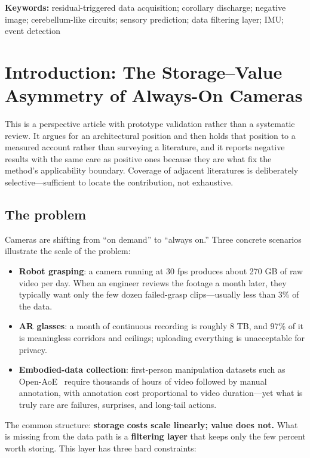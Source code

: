\documentclass[12pt,a4paper]{article}
\begin{document}
\noindent\textbf{Keywords:} residual-triggered data acquisition; corollary discharge; negative image; cerebellum-like circuits; sensory prediction; data filtering layer; IMU; event detection

\tableofcontents
\newpage

\section{Introduction: The Storage--Value Asymmetry of Always-On Cameras}

This is a perspective article with prototype validation rather than a systematic review. It argues for an architectural position and then holds that position to a measured account rather than surveying a literature, and it reports negative results with the same care as positive ones because they are what fix the method's applicability boundary. Coverage of adjacent literatures is deliberately selective---sufficient to locate the contribution, not exhaustive.

\subsection{The problem}

Cameras are shifting from ``on demand'' to ``always on.'' Three concrete scenarios illustrate the scale of the problem:

\begin{itemize}
  \item \textbf{Robot grasping}: a camera running at 30 fps produces about 270 GB of raw video per day. When an engineer reviews the footage a month later, they typically want only the few dozen failed-grasp clips---usually less than 3\% of the data.
  \item \textbf{AR glasses}: a month of continuous recording is roughly 8 TB, and 97\% of it is meaningless corridors and ceilings; uploading everything is unacceptable for privacy.
  \item \textbf{Embodied-data collection}: first-person manipulation datasets such as Open-AoE~\cite{openaoe} require thousands of hours of video followed by manual annotation, with annotation cost proportional to video duration---yet what is truly rare are failures, surprises, and long-tail actions.
\end{itemize}

The common structure: \textbf{storage costs scale linearly; value does not.} What is missing from the data path is a \textbf{filtering layer} that keeps only the few percent worth storing. This layer has three hard constraints:
\end{document}
